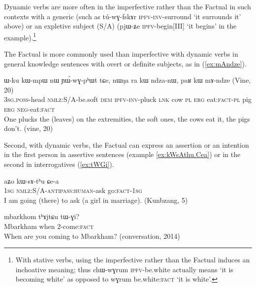 \documentclass[oldfontcommands,oneside,a4paper,11pt]{article}
\newcommand{\ipa}[1]{{\phon \mbox{#1}}} %
\newcommand{\refb}[1]{(\ref{#1})}
\newcommand{\factual}[1]{\textsc{:fact}}
\begin{document}
 Dynamic verbs are more often in the imperfective rather than the Factual in such contexts with a generic (such as \ipa{tú-wɣ-fskɤr}  \textsc{ipfv-inv}-surround  `it surrounds it' above)  or an expletive subject (S/A) (\ipa{pjɯ-ʑe} \textsc{ipfv}-begin[III] `it begins' in the example).\footnote{With stative verbs, using the imperfective rather than the Factual induces an inchoative meaning; thus \ipa{chɯ-wɣrum} \textsc{ipfv}-be.white actually means `it is becoming white' as opposed to \ipa{wɣrum} be.white\factual{} `it is white'.}
 
 The Factual is more commonly used than imperfective with dynamic verbs in general knowledge sentences with overt or definite subjects, as in \refb{ex:mAndze}.  

\begin{exe}
\ex \label{ex:mAndze}
\gll
   	\ipa{ɯ-ku}  	\ipa{kɯ-mpɯ}  	\ipa{nɯ}  	\ipa{ɲɯ́-wɣ-pʰɯt}  	\ipa{tɕe,}  \ipa{nɯŋa}  	\ipa{ra}  	\ipa{kɯ}  	\ipa{ndza-nɯ,}  	\ipa{paʁ}  	\ipa{kɯ}  	\ipa{mɤ-ndze}  
(Vine, 20) \\
\textsc{3sg.poss}-head \textsc{nmlz}:S/A-be.soft \textsc{dem} \textsc{ipfv-inv}-pluck \textsc{lnk} cow \textsc{pl} \textsc{erg} eat:\textsc{fact-pl} pig \textsc{erg} \textsc{neg}-eat\factual{} \\
\glt  One plucks the (leaves) on the extremities, the soft ones, the cows eat it, the pigs don't. (vine, 20)
\end{exe}

 
Second, with dynamic verbs, the Factual can express an assertion or an intention in the first person in assertive sentences (example \ref{ex:kWsAthu.Cea}) or in the second in interrogatives (\ref{ex:tWGi}).

\begin{exe}
\ex \label{ex:kWsAthu.Cea}
\gll
\ipa{aʑo}  	\ipa{kɯ-sɤ-tʰu}  	\ipa{ɕe-a}  \\
\textsc{1sg} \textsc{nmlz}:S/A-\textsc{antipass:human}-ask go\factual{}-\textsc{1sg} \\
\glt I am going (there) to ask (a girl in marriage). (Kunbzang, 5)
\end{exe}

\begin{exe}
\ex \label{ex:tWGi}
\gll
\ipa{mbarkhom} \ipa{tʰɤjtɕu} \ipa{tɯ-ɣi}?\\
Mbarkham when 2-come\factual{} \\
\glt When are you coming to Mbarkham? (conversation, 2014)
\end{exe}
\end{document}
